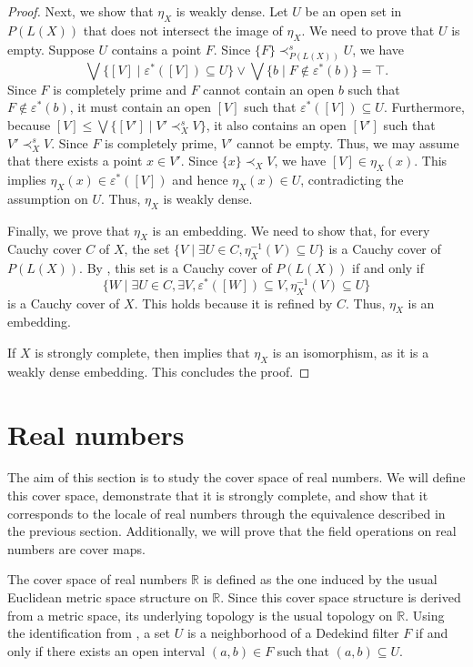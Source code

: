 \documentclass[pdflatex,sn-mathphys-num]{sn-jnl}
\theoremstyle{definition}
\theoremstyle{remark}
\numberwithin{figure}{section}
\newcommand{\rb}{\prec}
\begin{document}
\begin{proof}
Next, we show that $\eta_X$ is weakly dense.
Let $U$ be an open set in $P(L(X))$ that does not intersect the image of $\eta_X$.
We need to prove that $U$ is empty.
Suppose $U$ contains a point $F$.
Since $\{ F \} \rb^s_{P(L(X))} U$, we have 
\[
\bigvee \{ [V] \mid \varepsilon^*([V]) \subseteq U \} \vee \bigvee \{ b \mid F \notin \varepsilon^*(b) \} = \top.
\]
Since $F$ is completely prime and $F$ cannot contain an open $b$ such that $F \notin \varepsilon^*(b)$, it must contain an open $[V]$ such that $\varepsilon^*([V]) \subseteq U$.
Furthermore, because $[V] \leq \bigvee \{ [V'] \mid V' \rb^s_X V \}$, it also contains an open $[V']$ such that $V' \rb^s_X V$.
Since $F$ is completely prime, $V'$ cannot be empty.
Thus, we may assume that there exists a point $x \in V'$.
Since $\{ x \} \rb_X V$, we have $[V] \in \eta_X(x)$.
This implies $\eta_X(x) \in \varepsilon^*([V])$ and hence $\eta_X(x) \in U$, contradicting the assumption on $U$.
Thus, $\eta_X$ is weakly dense.

Finally, we prove that $\eta_X$ is an embedding.
We need to show that, for every Cauchy cover $C$ of $X$, the set $\{ V \mid \exists U \in C, \eta_X^{-1}(V) \subseteq U \}$ is a Cauchy cover of $P(L(X))$.
By , this set is a Cauchy cover of $P(L(X))$ if and only if 
\[
\{ W \mid \exists U \in C, \exists V, \varepsilon^*([W]) \subseteq V, \eta_X^{-1}(V) \subseteq U \}
\]
is a Cauchy cover of $X$.
This holds because it is refined by $C$.
Thus, $\eta_X$ is an embedding.

If $X$ is strongly complete, then  implies that $\eta_X$ is an isomorphism, as it is a weakly dense embedding.
This concludes the proof.
\end{proof}

\section{Real numbers}
\label{sec:reals}

The aim of this section is to study the cover space of real numbers.
We will define this cover space, demonstrate that it is strongly complete, and show that it corresponds to the locale of real numbers through the equivalence described in the previous section.
Additionally, we will prove that the field operations on real numbers are cover maps.

The cover space of real numbers $\mathbb{R}$ is defined as the one induced by the usual Euclidean metric space structure on $\mathbb{R}$.
Since this cover space structure is derived from a metric space, its underlying topology is the usual topology on $\mathbb{R}$.
Using the identification from , a set $U$ is a neighborhood of a Dedekind filter $F$ if and only if there exists an open interval $(a,b) \in F$ such that $(a,b) \subseteq U$.
\end{document}
